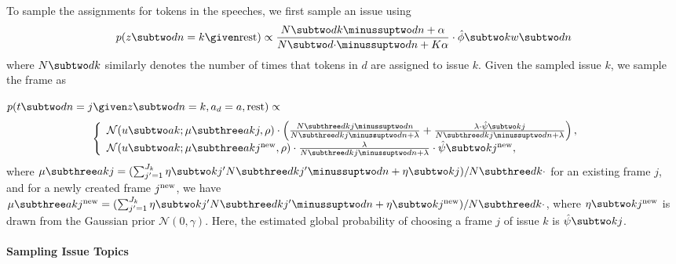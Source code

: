 To sample the assignments for tokens in the speeches, we first sample
an issue using
\begin{equation}
  p(z \subtwo dn = k \given \mbox{rest}) \propto
  \frac{N \subtwo dk \minussuptwo dn + \alpha}{N \subtwo d{\cdot} \minussuptwo dn + K \alpha} \cdot
  \hat{\phi} \subtwo k{w \subtwo dn}
  
\end{equation}
where $N \subtwo dk$ similarly denotes the number of times that tokens
in $d$ are assigned to issue $k$. Given the sampled issue $k$, we
sample the frame as 

$p(t \subtwo dn = j \given z \subtwo dn = k, a_d =
a, \mbox{rest}) \propto$
\begin{equation}
\left\{
  \begin{array}{ll}
    \mathcal{N}(u \subtwo ak; \mu \subthree akj, \rho) \cdot
     \left(\frac{N \subthree dkj \minussuptwo dn}{N \subthree dkj \minussuptwo dn + \lambda} +
        \frac{\lambda \cdot \hat{\psi} \subtwo kj}{N \subthree dkj \minussuptwo dn + \lambda }
        \right),
     & \\
     \mathcal{N}(u \subtwo ak; \mu \subthree ak{j^{\mbox{\scriptsize new}}}, \rho) \cdot
     \frac{\lambda}{N \subthree dkj \minussuptwo dn + \lambda} \cdot
        \hat{\psi} \subtwo k{j^{\mbox{\scriptsize new}}}
        
        ,
     &
  \end{array}
\right.
\label{eqn:c6_sample_t}
\end{equation}
where $\mu \subthree akj = (\sum_{j'=1}^{J_k} \eta \subtwo k{j'} N \subthree dk{j'} \minussuptwo dn
+ \eta \subtwo kj) /  N \subthree dk{\cdot}$ for an existing frame $j$, and for a newly created
frame $j^{\mbox{\scriptsize new}}$, we have $\mu \subthree ak{j^{\mbox{\scriptsize new}}} =
(\sum_{j'=1}^{J_k} \eta \subtwo k{j'} N \subthree dk{j'} \minussuptwo dn + \eta \subtwo
k{j^{\mbox{\scriptsize new}}}) /  N \subthree dk{\cdot}$, where $\eta \subtwo
k{j^{\mbox{\scriptsize new}}}$ is drawn from the Gaussian prior $\mathcal{N}(0, \gamma)$. Here, the
estimated global probability of choosing a frame $j$ of issue $k$ is $\hat{\psi} \subtwo kj$. 

\paragraph{Sampling Issue Topics}

